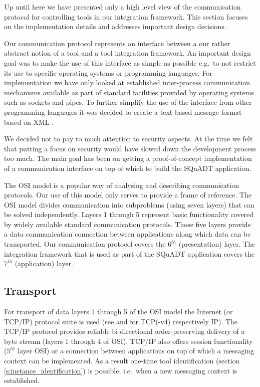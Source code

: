 \documentclass{article}
\newcommand{\squadt}{SQuADT\xspace}
\begin{document}
   Up until here we have presented only a high level view of the communication
   protocol for controlling tools in our integration framework. This section
   focuses on the implementation details and addresses important design
   decisions.

   Our communication protocol represents an interface between a our rather
   abstract notion of a tool and a tool integration framework. An important
   design goal was to make the use of this interface as simple as possible
   e.g.\ to not restrict its use to specific operating systems or programming
   languages. For implementation we have only looked at established
   inter-process communication mechanisms available as part of standard
   facilities provided by operating systems such as sockets and pipes.  To
   further simplify the use of the interface from other programming languages
   it was decided to create a text-based message format based on XML
   \cite{XML-1_0-4}.

   We decided not to pay to much attention to security aspects.  At the time we
   felt that putting a focus on security would have slowed down the development
   process too much. The main goal has been on getting a proof-of-concept
   implementation of a communication interface on top of which to build the
   \squadt application.

   The OSI model \cite{Day1983} is a popular way of analysing and describing
   communication protocols. Our use of this model only serves to provide a
   frame of reference. The OSI model divides communication into subproblems
   (using seven layers) that can be solved independently. Layers 1 through 5
   represent basic functionality covered by widely available standard
   communication protocols. Those five layers provide a data communication
   connection between applications along which data can be transported.  Our
   communication protocol covers the $6^{th}$ (presentation) layer. The
   integration framework that is used as part of the \squadt application covers
   the $7^{th}$ (application) layer.

  \subsection{Transport} \label{ss:transport}

   For transport of data layers 1 through 5 of the OSI model the Internet (or
   TCP/IP) protocol suite is used (see \cite{rfc793} and \cite{rfc791} for
   TCP(-v4) respectively IP). The TCP/IP protocol provides reliable
   bi-directional order-preserving delivery of a byte stream (layers 1 through
   4 of OSI). TCP/IP also offers session functionality ($5^{th}$ layer OSI) or a
   connection between applications on top of which a messaging context can be
   implemented. As a result one-time tool identification (section
   \ref{s:instance_identification}) is possible, i.e.\ when a new messaging
   context is established. %
\end{document}
